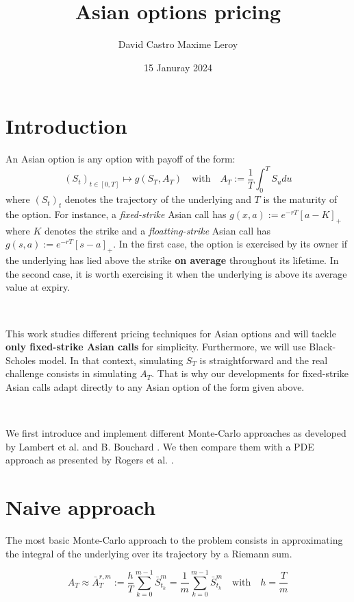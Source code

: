 \documentclass{article}
\title{Asian options pricing}
\author{David Castro \qquad Maxime Leroy}
\date{15 Januray 2024}
\begin{document}
\maketitle

\section*{Introduction}

An Asian option is any option with payoff of the form:
\[
	\left( S_t \right)_{t \in [0, T]} \mapsto g \left( S_T, A_T \right) \quad \text{with} \quad A_T := \frac{1}{T} \int_0^T S_u du
\]
where $\left( S_t \right)_t$ denotes the trajectory of the underlying and $T$ is the maturity of the option.
For instance, a \textit{fixed-strike} Asian call has $g(x, a) := e^{-rT} \left[ a - K \right]_+$ where $K$ denotes the strike
and a \textit{floatting-strike} Asian call has $g(s, a) := e^{-rT}  \left[ s - a \right]_+$.
In the first case, the option is exercised by its owner
if the underlying has lied above the strike \textbf{on average} throughout its lifetime. In the second case,
it is worth exercising it when the underlying is above its average value at expiry.

\

This work studies different pricing techniques for Asian options and will tackle \textbf{only fixed-strike Asian calls}
for simplicity. Furthermore, we will use Black-Scholes model. In that context, simulating $S_T$ is straightforward
and the real challenge consists in simulating $A_T$. That is why our developments for fixed-strike Asian calls
adapt directly to any Asian option of the form given above.

\

We first introduce and implement different Monte-Carlo approaches as developed by Lambert et al. \cite{main}
and B. Bouchard \cite{Bouchard}. We then compare them with a PDE approach as presented by
Rogers et al. \cite{Rogers}.

\section{Naive approach}

The most basic Monte-Carlo approach to the problem consists in approximating the integral
of the underlying over its trajectory by a Riemann sum.

\[
	A_T \approx \bar A_T^{r, m} := \frac{h}{T} \sum_{k=0}^{m-1} \bar S_{t_k}^m
	= \frac{1}{m} \sum_{k=0}^{m-1} \bar S_{t_k}^m \quad \text{with} \quad h = \frac{T}{m}
\]
\end{document}

